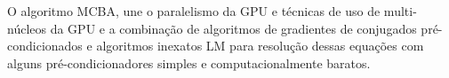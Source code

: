 \begin{itemize}
O algoritmo MCBA, une o paralelismo da GPU e técnicas de uso de multi-núcleos da GPU e a combinação  de algoritmos de gradientes de conjugados pré-condicionados e algoritmos inexatos LM para resolução dessas equações  com alguns pré-condicionadores simples e computacionalmente baratos. 














\end{itemize}
